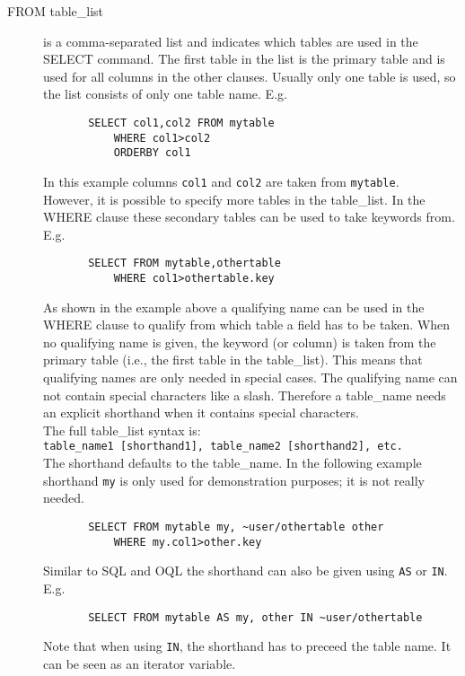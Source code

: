 \begin{description}
  \item[ \label{TAQL:TABLE_LIST}FROM table\_list ]
       is a comma-separated list and indicates which tables are used in
       the SELECT command. The first table in the list is the primary
       table and is used for all columns in the other clauses.
       Usually only one table is used, so the list consists of only one
       table name. E.g.
       \begin{verbatim}
       SELECT col1,col2 FROM mytable
           WHERE col1>col2
           ORDERBY col1
       \end{verbatim}
       In this example columns \texttt{col1} and \texttt{col2}
       are taken from \texttt{mytable}.
       \\However, it is possible to specify more tables in the table\_list.
       In the WHERE clause these secondary tables can be used to take
       keywords from. E.g.
       \begin{verbatim}
       SELECT FROM mytable,othertable
           WHERE col1>othertable.key
       \end{verbatim}
       As shown in the example above a qualifying name
       can be used in the WHERE
       clause to qualify from which table a field has to be taken.
       When no qualifying name is given, the keyword (or column) is taken
       from the primary table (i.e., the first table in the table\_list).
       This means that qualifying names are only needed in special cases.
       The qualifying name can not contain special characters like a slash.
       Therefore a table\_name needs an explicit shorthand when it contains
       special characters.
       \\The full table\_list syntax is:
       \\
       \texttt{table\_name1 [shorthand1], table\_name2 [shorthand2], etc.}
       \\The shorthand defaults to the table\_name.
       In the following example shorthand \texttt{my} is only used
       for demonstration purposes; it is not really needed.
       \begin{verbatim}
       SELECT FROM mytable my, ~user/othertable other
           WHERE my.col1>other.key
       \end{verbatim}
       Similar to SQL and OQL the shorthand can also be given using
       \texttt{AS} or \texttt{IN}. E.g.
       \begin{verbatim}
       SELECT FROM mytable AS my, other IN ~user/othertable
       \end{verbatim}
       Note that when using \texttt{IN}, the shorthand has to preceed
       the table name. It can be seen as an iterator variable.


\end{description}
